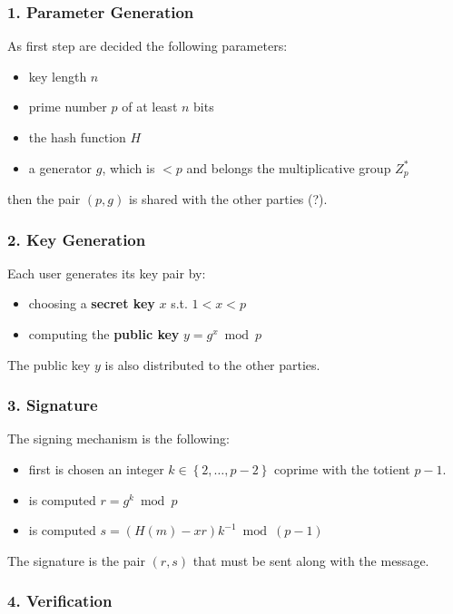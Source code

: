 \documentclass[oneside]{academica}
\begin{document}
\subsubsection{1. Parameter Generation}

As first step are decided the following parameters:
\begin{itemize}
  \item key length $n$
  \item prime number $p$ of at least $n$ bits
  \item the hash function $H$
  \item a generator $g$, which is $<p$ and belongs the multiplicative group $Z_p^*$
\end{itemize}
then the pair $(p,g)$ is shared with the other parties (?).

\subsubsection{2. Key Generation}

Each user generates its key pair by:
\begin{itemize}
  \item choosing a \textbf{secret key} $x$ s.t. $1< x <p$
  \item computing the \textbf{public key} $y = g^x \bmod p$ 
\end{itemize}

The public key $y$ is also distributed to the other parties.

\subsubsection{3. Signature}

The signing mechanism is the following:
\begin{itemize}
  \item first is chosen an integer $k \in \left\{ 2, \ldots, p-2 \right\}$ coprime with the totient $p-1$.
  \item is computed $r = g^k \bmod p$
  \item is computed $s = \left( H(m) - xr \right) k^{-1} \bmod (p-1)$
\end{itemize}

The signature is the pair $(r,s)$ that must be sent along with the message.

\subsubsection{4. Verification}
\end{document}
